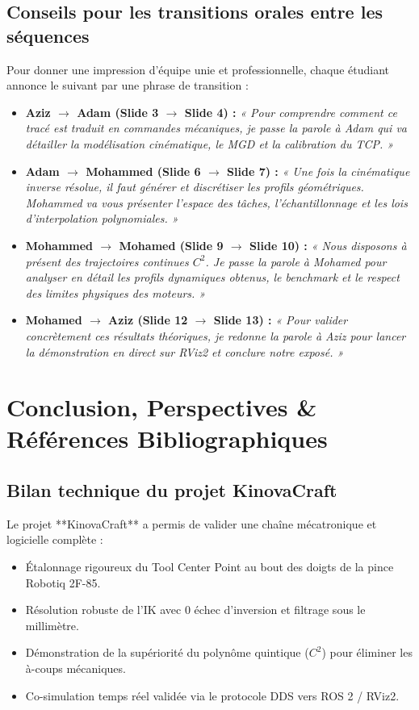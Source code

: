 \documentclass[11pt,a4paper]{report}
\begin{document}
\section{Conseils pour les transitions orales entre les séquences}
Pour donner une impression d'équipe unie et professionnelle, chaque étudiant annonce le suivant par une phrase de transition :
\begin{itemize}
    \item \textbf{Aziz $\to$ Adam (Slide 3 $\to$ Slide 4) :} \textit{« Pour comprendre comment ce tracé est traduit en commandes mécaniques, je passe la parole à Adam qui va détailler la modélisation cinématique, le MGD et la calibration du TCP. »}
    \item \textbf{Adam $\to$ Mohammed (Slide 6 $\to$ Slide 7) :} \textit{« Une fois la cinématique inverse résolue, il faut générer et discrétiser les profils géométriques. Mohammed va vous présenter l'espace des tâches, l'échantillonnage et les lois d'interpolation polynomiales. »}
    \item \textbf{Mohammed $\to$ Mohamed (Slide 9 $\to$ Slide 10) :} \textit{« Nous disposons à présent des trajectoires continues $C^2$. Je passe la parole à Mohamed pour analyser en détail les profils dynamiques obtenus, le benchmark et le respect des limites physiques des moteurs. »}
    \item \textbf{Mohamed $\to$ Aziz (Slide 12 $\to$ Slide 13) :} \textit{« Pour valider concrètement ces résultats théoriques, je redonne la parole à Aziz pour lancer la démonstration en direct sur RViz2 et conclure notre exposé. »}
\end{itemize}

\chapter{Conclusion, Perspectives \& Références Bibliographiques}

\section{Bilan technique du projet KinovaCraft}
Le projet **KinovaCraft** a permis de valider une chaîne mécatronique et logicielle complète :
\begin{itemize}
    \item Étalonnage rigoureux du Tool Center Point au bout des doigts de la pince Robotiq 2F-85.
    \item Résolution robuste de l'IK avec $0$ échec d'inversion et filtrage sous le millimètre.
    \item Démonstration de la supériorité du polynôme quintique ($C^2$) pour éliminer les à-coups mécaniques.
    \item Co-simulation temps réel validée via le protocole DDS vers ROS 2 / RViz2.
\end{itemize}
\end{document}
